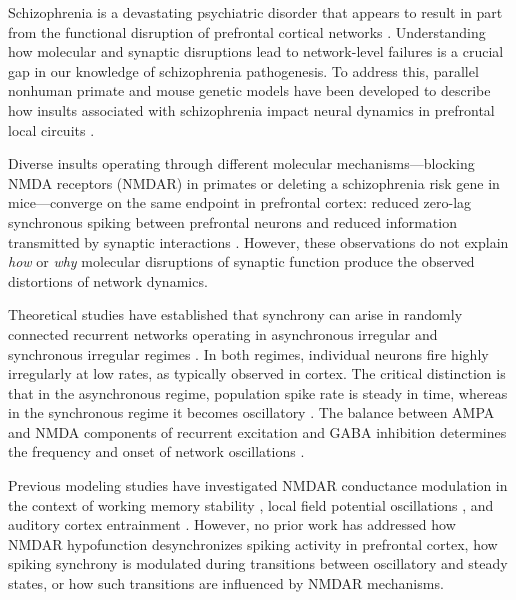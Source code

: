 \documentclass[10pt]{article}
\begin{document}
Schizophrenia is a devastating psychiatric disorder that appears to result in part from the functional disruption of prefrontal cortical networks \citep{insel2010rethinking, jauhar2022schizophrenia}. Understanding how molecular and synaptic disruptions lead to network-level failures is a crucial gap in our knowledge of schizophrenia pathogenesis. To address this, parallel nonhuman primate and mouse genetic models have been developed to describe how insults associated with schizophrenia impact neural dynamics in prefrontal local circuits \citep{zick2018blocking, kummerfeld2020temporal, zick2021disparate}.

Diverse insults operating through different molecular mechanisms---blocking NMDA receptors (NMDAR) in primates or deleting a schizophrenia risk gene in mice---converge on the same endpoint in prefrontal cortex: reduced zero-lag synchronous spiking between prefrontal neurons and reduced information transmitted by synaptic interactions \citep{kummerfeld2020temporal, zick2021disparate, zick2018blocking}. However, these observations do not explain \textit{how} or \textit{why} molecular disruptions of synaptic function produce the observed distortions of network dynamics.

Theoretical studies have established that synchrony can arise in randomly connected recurrent networks operating in asynchronous irregular and synchronous irregular regimes \citep{brunel2000dynamics, brunel1999fast, vanvreeswijk1996chaos, renart2010asynchronous, vicente2008dynamical}. In both regimes, individual neurons fire highly irregularly at low rates, as typically observed in cortex. The critical distinction is that in the asynchronous regime, population spike rate is steady in time, whereas in the synchronous regime it becomes oscillatory \citep{brunel2000dynamics}. The balance between AMPA and NMDA components of recurrent excitation and GABA inhibition determines the frequency and onset of network oscillations \citep{brunel2003fast, brunel2001effects}.

Previous modeling studies have investigated NMDAR conductance modulation in the context of working memory stability \citep{wang1999synaptic, compte2000synaptic}, local field potential oscillations \citep{brunel2003fast}, and auditory cortex entrainment \citep{kirli2014computational}. However, no prior work has addressed how NMDAR hypofunction desynchronizes spiking activity in prefrontal cortex, how spiking synchrony is modulated during transitions between oscillatory and steady states, or how such transitions are influenced by NMDAR mechanisms.
\end{document}
